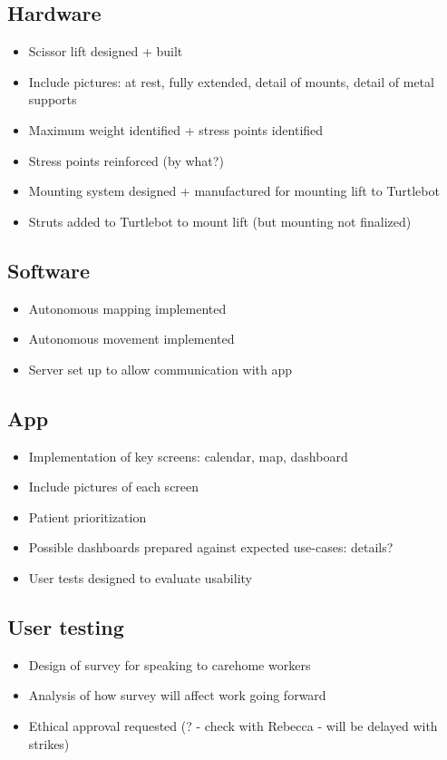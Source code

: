 \documentclass{article}
\begin{document}
\subsection{Hardware}
\begin{itemize}
\item Scissor lift designed + built 
\item Include pictures: at rest, fully extended, detail of mounts, detail of metal supports
\item Maximum weight identified + stress points identified
\item Stress points reinforced (by what?)
\item Mounting system designed + manufactured for mounting lift to Turtlebot 
\item Struts added to Turtlebot to mount lift (but mounting not finalized)
\end{itemize}

\subsection{Software}
\begin{itemize}
\item Autonomous mapping implemented
\item Autonomous movement implemented 
\item Server set up to allow communication with app
\end{itemize}

\subsection{App}
\begin{itemize}
\item Implementation of key screens: calendar, map, dashboard
\item Include pictures of each screen
\item Patient prioritization
\item Possible dashboards prepared against expected use-cases: details?
\item User tests designed to evaluate usability
\end{itemize}

\subsection{User testing}
\begin{itemize}
\item Design of survey for speaking to carehome workers
\item Analysis of how survey will affect work going forward
\item Ethical approval requested (? - check with Rebecca - will be delayed with strikes)
\end{itemize}
\end{document}
